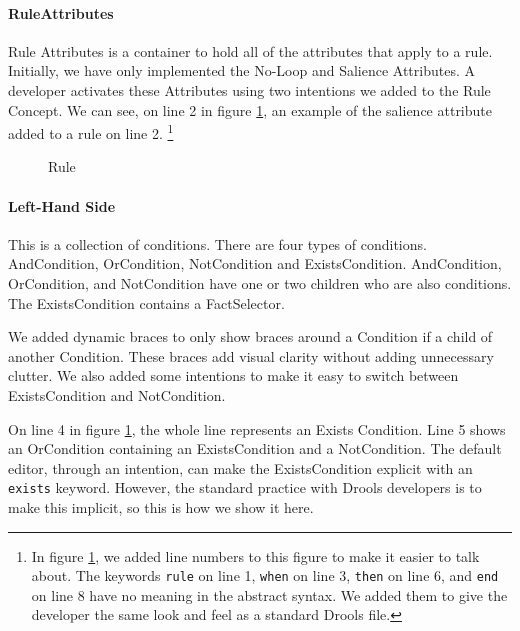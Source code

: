 \paragraph{RuleAttributes} Rule Attributes is a container to hold all of the attributes that apply to a rule.
Initially, we have only implemented the No-Loop and Salience Attributes.
A developer activates these Attributes using two intentions we added to the Rule Concept.
We can see, on line 2 in figure \ref{fig:Rule}, an example of the salience attribute added to a rule on line 2.
\footnote{In figure \ref{fig:Rule}, we added line numbers to this figure to make it easier to talk about.
The keywords \texttt{rule} on line 1, \texttt{when} on line 3, \texttt{then} on line 6, and \texttt{end} on line 8 have no meaning in the abstract syntax.
We added them to give the developer the same look and feel as a standard Drools file.}

\begin{figure}[h]
    \centering
    \caption{Rule}
    \label{fig:Rule}
\end{figure}

\paragraph{Left-Hand Side} This is a collection of conditions.
There are four types of conditions.
AndCondition, OrCondition, NotCondition and ExistsCondition.
AndCondition, OrCondition, and NotCondition have one or two children who are also conditions.
The ExistsCondition contains a FactSelector.

We added dynamic braces to only show braces around a Condition if a child of another Condition.
These braces add visual clarity without adding unnecessary clutter.
We also added some intentions to make it easy to switch between ExistsCondition and NotCondition.

On line 4 in figure \ref{fig:Rule}, the whole line represents an Exists Condition.
Line 5 shows an OrCondition containing an ExistsCondition and a NotCondition.
The default editor, through an intention, can make the ExistsCondition explicit with an \texttt{exists} keyword.
However, the standard practice with Drools developers is to make this implicit, so this is how we show it here.

